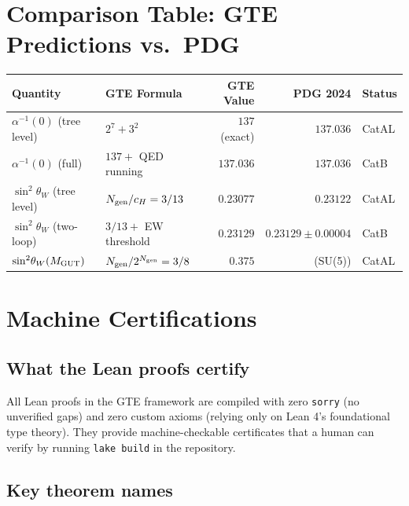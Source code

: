 \documentclass[11pt,a4paper]{article}
\newcommand{\sinwsq}{\sin^2\!\theta_W}
\newcommand{\Ngen}{N_{\rm gen}}
\newcommand{\cH}{c_H}
\begin{document}
\section{Comparison Table: GTE Predictions vs.\ PDG}

\begin{center}
\begin{tabular}{p{3.2cm}p{3.5cm}r r l}
\toprule
Quantity & GTE Formula & GTE Value & PDG 2024 & Status \\
\midrule
$\alpha^{-1}(0)$ (tree level)
  & $2^7 + 3^2$
  & $137$ (exact)
  & $137.036$
  & CatAL \\
$\alpha^{-1}(0)$ (full)
  & $137 +$ QED running
  & $137.036$
  & $137.036$
  & CatB \\
\addlinespace
$\sinwsq$ (tree level)
  & $\Ngen/\cH = 3/13$
  & $0.23077$
  & $0.23122$
  & CatAL \\
$\sinwsq$ (two-loop)
  & $3/13 +$ EW threshold
  & $0.23129$
  & $0.23129\pm 0.00004$
  & CatB \\
\addlinespace
$\sinwsq(M_{\rm GUT})$
  & $\Ngen/2^{\Ngen} = 3/8$
  & $0.375$
  & (SU(5))
  & CatAL \\
\bottomrule
\end{tabular}
\end{center}

\section{Machine Certifications}

\subsection{What the Lean proofs certify}

All Lean proofs in the GTE framework are compiled with zero \texttt{sorry}
(no unverified gaps) and zero custom axioms (relying only on Lean 4's
foundational type theory).  They provide machine-checkable certificates
that a human can verify by running \texttt{lake build} in the repository.

\subsection{Key theorem names}
\end{document}
